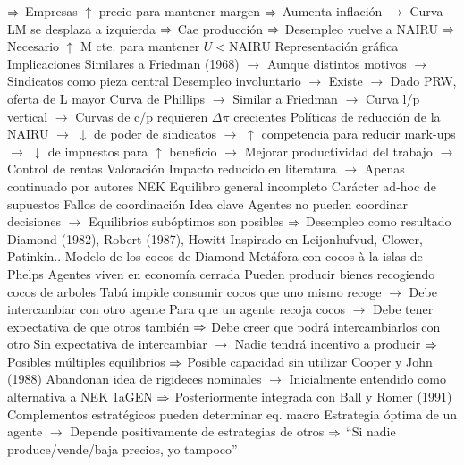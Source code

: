 \documentclass{nuevotema}
\begin{document}
\begin{esquemal}
				\4[] $\Rightarrow$ Empresas $\uparrow$ precio para mantener margen
				\4[] $\Rightarrow$ Aumenta inflación
				\4[] $\to$ Curva LM se desplaza a izquierda
				\4[] $\Rightarrow$ Cae producción
				\4[] $\Rightarrow$ Desempleo vuelve a NAIRU
				\4[] $\Rightarrow$ Necesario $\uparrow$ M cte. para mantener $U < \text{NAIRU}$
				\4[] Representación gráfica
				\4[] 
				\4 Implicaciones
				\4[] Similares a Friedman (1968)
				\4[] $\to$ Aunque distintos motivos
				\4[] $\to$ Sindicatos como pieza central
				\4[] Desempleo involuntario
				\4[] $\to$ Existe
				\4[] $\to$ Dado PRW, oferta de L mayor
				\4[] Curva de Phillips
				\4[] $\to$ Similar a Friedman
				\4[] $\to$ Curva l/p vertical
				\4[] $\to$ Curvas de c/p requieren $\Delta \pi$ crecientes
				\4[] Políticas de reducción de la NAIRU
				\4[] $\to$ $\downarrow$ de poder de sindicatos
				\4[] $\to$ $\uparrow$ competencia para reducir mark-ups
				\4[] $\to$ $\downarrow$ de impuestos para $\uparrow$ beneficio
				\4[] $\to$ Mejorar productividad del trabajo
				\4[] $\to$ Control de rentas
				\4 Valoración
				\4[] Impacto reducido en literatura
				\4[] $\to$ Apenas continuado por autores NEK
				\4[] Equilibro general incompleto
				\4[] Carácter ad-hoc de supuestos
			\3 Fallos de coordinación
				\4 Idea clave
				\4[] Agentes no pueden coordinar decisiones
				\4[] $\to$ Equilibrios subóptimos son posibles
				\4[] $\Rightarrow$ Desempleo como resultado
				\4 Diamond (1982), Robert (1987), Howitt
				\4[] Inspirado en Leijonhufvud, Clower, Patinkin..
				\4 Modelo de los cocos de Diamond
				\4[] Metáfora con cocos à la islas de Phelps
				\4[] Agentes viven en economía cerrada
				\4[] Pueden producir bienes recogiendo cocos de arboles
				\4[] Tabú impide consumir cocos que uno mismo recoge
				\4[] $\to$ Debe intercambiar con otro agente
				\4[] Para que un agente recoja cocos
				\4[] $\to$ Debe tener expectativa de que otros también
				\4[] $\Rightarrow$ Debe creer que podrá intercambiarlos con otro
				\4[] Sin expectativa de intercambiar
				\4[] $\to$ Nadie tendrá incentivo a producir
				\4[] $\Rightarrow$ Posibles múltiples equilibrios
				\4[] $\Rightarrow$ Posible capacidad sin utilizar
				\4 Cooper y John (1988)
				\4[] Abandonan idea de rigideces nominales
				\4[] $\to$ Inicialmente entendido como alternativa a NEK 1aGEN
				\4[] $\Rightarrow$ Posteriormente integrada con Ball y Romer (1991)
				\4[] Complementos estratégicos pueden determinar eq. macro
				\4[] Estrategia óptima de un agente
				\4[] $\to$ Depende positivamente de estrategias de otros
				\4[] $\Rightarrow$ ``Si nadie produce/vende/baja precios, yo tampoco''

\end{esquemal}
\end{document}
